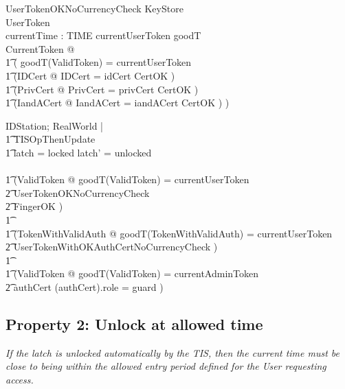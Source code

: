 \begin{schema}{UserTokenOKNoCurrencyCheck}
        KeyStore
\\      UserToken
\\      currentTime : TIME
\where
 	currentUserToken \in \ran goodT
\\	\exists CurrentToken @ 
\\ \t1		(
		goodT(\theta ValidToken) = currentUserToken
\\ \t1          \land (\exists IDCert @ \theta IDCert = idCert \land CertOK )
\\ \t1          \land (\exists PrivCert @ \theta PrivCert = privCert
\land CertOK )
\\ \t1          \land (\exists IandACert @ \theta IandACert =
iandACert \land CertOK )  
                )
\end{schema}

\begin{zed}
\Delta IDStation; \Delta RealWorld |
\\ \t1	TISOpThenUpdate
\\ \t1	\land latch = locked \land latch' = unlocked
\\ \shows
\\ \t1	(\exists ValidToken @
			goodT(\theta ValidToken) = currentUserToken
\\ \t2		\land UserTokenOKNoCurrencyCheck
\\ \t2		\land FingerOK
		)
\\ \t1	\lor
\\ \t1	(\exists TokenWithValidAuth @
			goodT(\theta TokenWithValidAuth) = currentUserToken
\\ \t2		\land UserTokenWithOKAuthCertNoCurrencyCheck
		)
\\ \t1 	\lor
\\ \t1  	(\exists ValidToken @
			goodT(\theta ValidToken) = currentAdminToken
\\ \t2			\land authCert \neq \emptyset 
				\land (\The authCert).role = guard
		)
\end{zed}

\subsection{Property 2: Unlock at allowed time}
\label{sec:UnlockTimeProp}
{\em If the latch is unlocked automatically by the TIS,
then the current time must be close to being within the allowed entry period defined
for the User requesting access.
}

